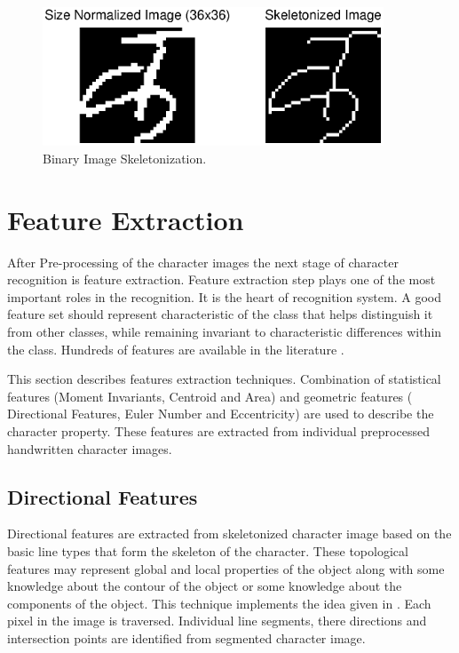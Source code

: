 \begin{figure}[h]
\centering
\includegraphics[width=4in]{figures/ka_preprocessing/skeletonized.eps}
\caption{Binary Image Skeletonization.}
\label{figure_skeletonized}
\end{figure}

\newpage
\section{Feature Extraction}\label{section_feature_extraction_methodology}
After Pre-processing of the character images the next stage of character recognition is feature extraction. Feature extraction step plays one of the most important roles in the recognition. It is the heart of recognition system. A good feature set should represent  characteristic of the class that helps distinguish it from other classes, while remaining invariant to characteristic differences within the class. Hundreds of features are available in the literature \cite{Jain1996,Jain2000,Zhang2004}.

This section describes features extraction techniques. Combination of statistical features (Moment Invariants, Centroid and Area) and geometric features ( Directional Features, Euler Number and Eccentricity) are used to describe the character property. These features are extracted from individual preprocessed handwritten character images.

\subsection{Directional Features}
\label{section_directional_features}
Directional features are extracted from skeletonized character image based on the basic line types that form the skeleton of the character. These topological features may represent global and local properties of the object along with some knowledge about the contour of the object or some knowledge about the components of the object.
This technique implements the idea given in \cite{Blumenstein2003}. Each pixel in the image is traversed. Individual line segments, there directions and intersection points are identified from segmented character image.

